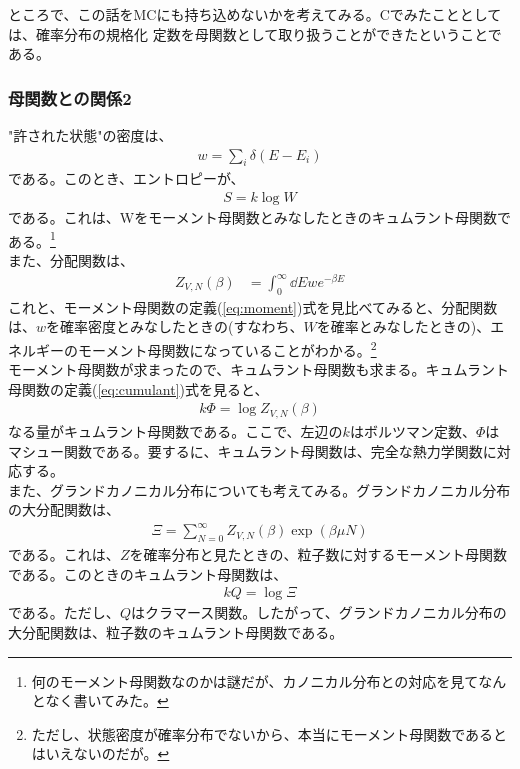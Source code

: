 \documentclass[a4paper,11pt]{jsarticle}
\numberwithin{equation}{section}
\begin{document}
ところで、この話をMCにも持ち込めないかを考えてみる。Cでみたこととしては、確率分布の規格化
定数を母関数として取り扱うことができたということである。

\subsubsection{母関数との関係2}
"許された状態"の密度は、
\begin{align}
  w = \sum_{i}\delta(E-E_{i})
\end{align}
である。このとき、エントロピーが、
\begin{align}
  S = k\log W
\end{align}
である。これは、Wをモーメント母関数とみなしたときのキュムラント母関数である。\footnote{何のモーメント母関数なのかは謎だが、カノニカル分布との対応を見てなんとなく書いてみた。}\\

また、分配関数は、
\begin{align}
  Z_{V,N}(\beta) &= \int_{0}^{\infty}\dd E w e^{-\beta E}
\end{align}
これと、モーメント母関数の定義(\ref{eq:moment})式を見比べてみると、分配関数は、$w$を確率密度とみなしたときの(すなわち、$W$を確率とみなしたときの)、エネルギーのモーメント母関数になっていることがわかる。\footnote{ただし、状態密度が確率分布でないから、本当にモーメント母関数であるとはいえないのだが。}\\
モーメント母関数が求まったので、キュムラント母関数も求まる。キュムラント母関数の定義(\ref{eq:cumulant})式を見ると、
\begin{align}
  k\Phi = \log Z_{V,N}(\beta)
\end{align}
なる量がキュムラント母関数である。ここで、左辺の$k$はボルツマン定数、$\Phi$はマシュー関数である。要するに、キュムラント母関数は、完全な熱力学関数に対応する。\\

また、グランドカノニカル分布についても考えてみる。グランドカノニカル分布の大分配関数は、
\begin{align}
  \Xi = \sum_{N=0}^{\infty}Z_{V,N}(\beta)\exp(\beta \mu N)
\end{align}
である。これは、$Z$を確率分布と見たときの、粒子数に対するモーメント母関数である。このときのキュムラント母関数は、
\begin{align}
  kQ = \log \Xi
\end{align}
である。ただし、$Q$はクラマース関数。したがって、グランドカノニカル分布の大分配関数は、粒子数のキュムラント母関数である。\\
\end{document}
